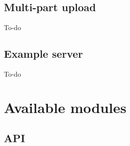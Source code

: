 \documentclass[letterpaper,10pt,english]{sphinxmanual}
\begin{document}
\section{Multi-part upload}
\label{Advanced examples:multi-part-upload}
To-do


\section{Example server}
\label{Advanced examples:example-server}
To-do


\chapter{Available modules}
\label{Available modules:available-modules}\label{Available modules::doc}

\section{API}
\label{Available modules:api}
\end{document}
